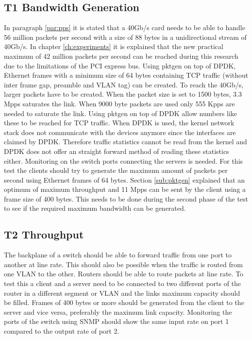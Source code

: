 \subsection{T1 Bandwidth Generation}
In paragraph \ref{par:pps} it is stated that a 40Gb/s card needs to be able to handle 56 million packets per second with a size of 88 bytes in a unidirectional stream of 40Gb/s.
In chapter \ref{ch:experiments} it is explained that the new practical maximum of 42 million packets per second can be reached during this research due to the limitations of the PCI express bus.  
Using pktgen on top of DPDK, Ethernet frames with a minimum size of 64 bytes containing TCP traffic (without inter frame gap, preamble and VLAN tag) can be created. 
To reach the 40Gb/s, larger packets have to be created. 
When the packet size is set to 1500 bytes, 3.3 Mpps saturates the link. 
When 9000 byte packets are used only 555 Kpps are needed to saturate the link. 
Using pktgen on top of DPDK allow numbers like these to be reached for TCP traffic. 
When DPDK is used, the kernel network stack does not communicate with the devices anymore since the interfaces are claimed by DPDK. 
Therefore traffic statistics cannot be read from the kernel and DPDK does not offer an straight forward method of reading these statistics either. 
Monitoring on the switch ports connecting the servers is needed. 
For this test the clients should try to generate the maximum amount of packets per second using Ethernet frames of 64 bytes. 
Section \ref{sub:pktgen} explained that an optimum of maximum throughput and 11 Mpps can be sent by the client using a frame size of 400 bytes. This needs to be done during the second phase of the test to see if the required maximum bandwidth can be generated.  

\subsection{T2 Throughput}
The backplane of a switch should be able to forward traffic from one port to another at line rate. This should also be possible when the traffic is routed from one VLAN to the other. Routers should be able to route packets at line rate. To test this a client and a server need to be connected to two different ports of the router in a different segment or VLAN and the links maximum capacity should be filled. Frames of 400 bytes or more should be generated from the client to the server and vice versa, preferably the maximum link capacity. Monitoring the ports of the switch using SNMP should show the same input rate on port 1 compared to the output rate of port 2.    

